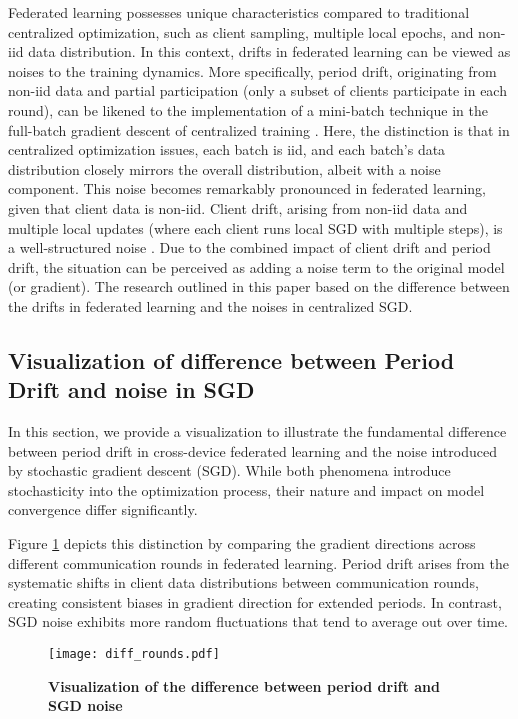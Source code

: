 Federated learning possesses unique characteristics compared to traditional centralized optimization, such as client sampling, multiple local epochs, and non-iid data distribution. In this context, drifts in federated learning can be viewed as noises to the training dynamics. More specifically, period drift, originating from non-iid data and partial participation (only a subset of clients participate in each round), can be likened to the implementation of a mini-batch technique in the full-batch gradient descent of centralized training \citep{ziyin2021strength}. Here, the distinction is that in centralized optimization issues, each batch is iid, and each batch's data distribution closely mirrors the overall distribution, albeit with a noise component. This noise becomes remarkably pronounced in federated learning, given that client data is non-iid. Client drift, arising from non-iid data and multiple local updates (where each client runs local SGD with multiple steps), is a well-structured noise \citep{lin2018don}. Due to the combined impact of client drift and period drift, the situation can be perceived as adding a noise term to the original model (or gradient). The research outlined in this paper based on the difference between the drifts in federated learning and the noises in centralized SGD. 

\subsection{Visualization of difference between Period Drift and noise in SGD}
\label{sec:diff_rounds}

In this section, we provide a visualization to illustrate the fundamental difference between period drift in cross-device federated learning and the noise introduced by stochastic gradient descent (SGD). While both phenomena introduce stochasticity into the optimization process, their nature and impact on model convergence differ significantly.

Figure \ref{fig:diff_rounds} depicts this distinction by comparing the gradient directions across different communication rounds in federated learning. Period drift arises from the systematic shifts in client data distributions between communication rounds, creating consistent biases in gradient direction for extended periods. In contrast, SGD noise exhibits more random fluctuations that tend to average out over time.

\begin{figure}[h]
    \centering
    \texttt{[image: diff\_rounds.pdf]}
    \caption{\small \textbf{Visualization of the difference between period drift and SGD noise}}
    \label{fig:diff_rounds}
\end{figure}

